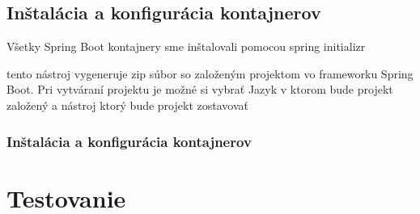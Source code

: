   

  

  

\subsection{Inštalácia a konfigurácia kontajnerov} 

 Všetky Spring Boot kontajnery sme inštalovali pomocou spring initializr 


tento nástroj vygeneruje zip súbor so založeným projektom vo frameworku Spring Boot. Pri vytváraní projektu je možné si vybrať Jazyk v ktorom bude projekt založený a nástroj ktorý bude projekt zostavovať %

\subsubsection{Inštalácia a konfigurácia kontajnerov} 

  

  

  

  

\section{Testovanie} 


  
